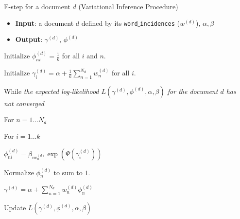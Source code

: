 \documentclass[final]{beamer}
\newlength{\onecolwid}
\newlength{\twocolwid}
\begin{document}
\begin{frame}[t]
\begin{columns}[t]
\begin{column}{\twocolwid}
\begin{columns}[t,totalwidth=\twocolwid]
\begin{column}{\onecolwid}

\end{column} %

\begin{column}{\onecolwid}\vspace{-.6in} %

% 

\begin{block}{E-step for a document $d$ (Variational Inference Procedure)}

\begin{itemize}
  \item \textbf{Input}: a document $d$ defined by its \texttt{word$\_$incidences} ($w^{(d)}$), $\alpha, \beta$
  \item \textbf{Output}: $\gamma^{(d)}$, $\phi^{(d)}$
\end{itemize}

\medskip

Initialize $\phi_{ni}^{(d)} = \frac{1}{k}$ for all $i$ and $n$.

Initialize $\gamma_i^{(d)} = \alpha + \frac{1}{k}\sum_{n=1}^{N_d} w_n^{(d)}$ for all $i$.

While {\emph{the expected log-likelihood $L(\gamma^{(d)}, \phi^{(d)}, \alpha, \beta)$ for the document $d$ has not converged}}{

\quad For {$n=1\ldots N_d$}{

\quad\quad For {$i=1\ldots k$}{

\quad\quad\quad $\phi_{ni}^{(d)} = \beta_{iw_n^{(d)}}\exp(\Psi(\gamma_i^{(d)}))$

}

\quad Normalize $\phi_n^{(d)}$ to sum to $1$.
}

\quad $\gamma^{(d)} = \alpha + \sum_{n=1}^{N_d} w_n^{(d)} \phi_n^{(d)}$

\quad Update $L(\gamma^{(d)}, \phi^{(d)}, \alpha, \beta)$
}

\end{block}


\end{column} %


\end{columns}
\end{column}
\end{columns}
\end{frame}
\end{document}
